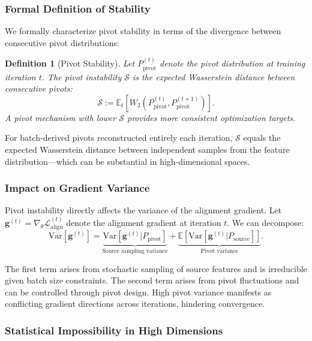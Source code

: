 \documentclass[preprint,12pt]{elsarticle}
\newtheorem{definition}{Definition}[section]
\begin{document}
\subsubsection{Formal Definition of Stability}

We formally characterize pivot stability in terms of the divergence between consecutive pivot distributions:

\begin{definition}[Pivot Stability]
\label{def:stability}
Let $P_{\text{pivot}}^{(t)}$ denote the pivot distribution at training iteration $t$. The \textit{pivot instability} $\mathcal{S}$ is the expected Wasserstein distance between consecutive pivots:
\begin{equation}
    \mathcal{S} := \mathbb{E}_t\left[W_2\left(P_{\text{pivot}}^{(t)}, P_{\text{pivot}}^{(t+1)}\right)\right].
\end{equation}
A pivot mechanism with lower $\mathcal{S}$ provides more consistent optimization targets.
\end{definition}

For batch-derived pivots reconstructed entirely each iteration, $\mathcal{S}$ equals the expected Wasserstein distance between independent samples from the feature distribution—which can be substantial in high-dimensional spaces.

\subsubsection{Impact on Gradient Variance}

Pivot instability directly affects the variance of the alignment gradient. Let $\mathbf{g}^{(t)} = \nabla_\theta \mathcal{L}_{\text{align}}^{(t)}$ denote the alignment gradient at iteration $t$. We can decompose:
\begin{equation}
    \text{Var}[\mathbf{g}^{(t)}] = \underbrace{\text{Var}[\mathbf{g}^{(t)} | P_{\text{pivot}}]}_{\text{Source sampling variance}} + \underbrace{\mathbb{E}[\text{Var}[\mathbf{g}^{(t)} | P_{\text{source}}]]}_{\text{Pivot variance}}.
\end{equation}

The first term arises from stochastic sampling of source features and is irreducible given batch size constraints. The second term arises from pivot fluctuations and can be controlled through pivot design. High pivot variance manifests as conflicting gradient directions across iterations, hindering convergence.

\subsubsection{Statistical Impossibility in High Dimensions}
\end{document}
